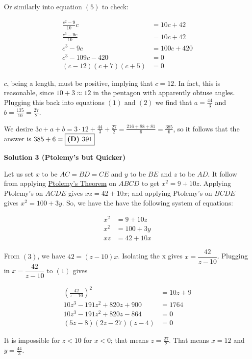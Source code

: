 \begin{enumerate}
 Or similarly into equation $(5)$ to check:

 
 \begin{align*} \frac{c^2-9}{10}c &= 10c+42\\ \frac{c^3-9c}{10} &= 10c + 42\\ c^3-9c &= 100c + 420\\ c^3-109c-420 &=0\\ (c-12)(c+7)(c+5)&=0 \end{align*}

$c$, being a length, must be positive, implying that $c=12$. In fact, this is reasonable, since $10+3\approx 12$ in the pentagon with apparently obtuse angles. Plugging this back into equations $(1)$ and $(2)$ we find that $a = \frac{44}{3}$ and $b= \frac{135}{10}=\frac{27}{2}$.

 We desire $3c+a+b = 3\cdot 12 + \frac{44}{3} + \frac{27}{2} = \frac{216+88+81}{6}=\frac{385}{6}$, so it follows that the answer is $385 + 6 = \fbox{\textbf{(D) }391}$




\textbf{Solution 3 (Ptolemy's but Quicker)}

Let us set $x$ to be $AC=BD=CE$ and $y$ to be $BE$ and $z$ to be $AD$. It follow from applying \href{https://artofproblemsolving.com/wiki/index.php?title=Ptolemy\%27s\_Theorem}{Ptolemy's Theorem} on $ABCD$ to get $x^2=9+10z$. Applying Ptolemy's on $ACDE$ gives $xz=42+10x$; and applying Ptolemy's on $BCDE$ gives $x^2=100+3y$. So, we have the have the following system of equations:

 
 \begin{align} x^2 &= 9+10z \\ x^2 &= 100+3y \\ xz &= 42+10x \end{align}

 From $(3)$, we have $42=(z-10)x$. Isolating the x gives $x=\dfrac{42}{z-10}$. Plugging in $x=\dfrac{42}{z-10}$ to $(1)$ gives

 
 \begin{align*} \left(\frac{42}{z-10}\right)^2 &= 10z+9\\ 10z^3 - 191z^2 + 820z + 900 &= 1764\\ 10z^3 - 191z^2 + 820z - 864 &= 0\\ (5z-8)(2z-27)(z-4) &=0 \end{align*}


 It is impossible for $z<10$ for $x<0$; that means $z=\frac{27}{2}$. That means $x = 12$ and $y = \frac{44}{3}$.


\end{enumerate}
